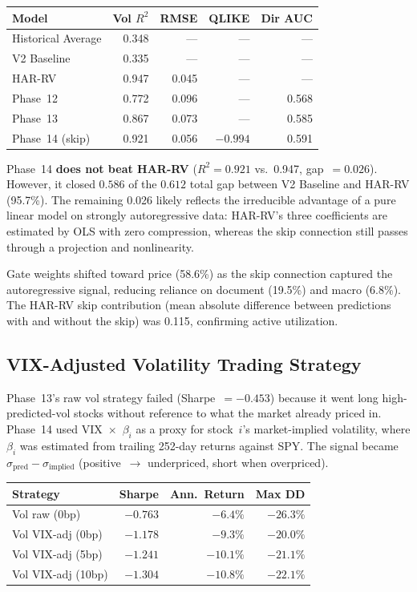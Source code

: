 \documentclass[12pt,a4paper]{article}
\begin{document}
\begin{center}
\begin{tabular}{l r r r r}
\hline
\textbf{Model} & \textbf{Vol $R^2$} & \textbf{RMSE} & \textbf{QLIKE} & \textbf{Dir AUC} \\
\hline
Historical Average & 0.348 & --- & --- & --- \\
V2 Baseline        & 0.335 & --- & --- & --- \\
HAR-RV             & 0.947 & 0.045 & --- & --- \\
Phase~12           & 0.772 & 0.096 & --- & 0.568 \\
Phase~13           & 0.867 & 0.073 & --- & 0.585 \\
Phase~14 (skip)    & 0.921 & 0.056 & $-0.994$ & 0.591 \\
\hline
\end{tabular}
\end{center}

Phase~14 \textbf{does not beat HAR-RV} ($R^2 = 0.921$ vs.\ 0.947, gap~$= 0.026$).
However, it closed $0.586$ of the $0.612$ total gap between V2 Baseline and
HAR-RV (95.7\%).  The remaining 0.026 likely reflects the irreducible advantage
of a pure linear model on strongly autoregressive data: HAR-RV's three
coefficients are estimated by OLS with zero compression, whereas the skip
connection still passes through a projection and nonlinearity.

Gate weights shifted toward price (58.6\%) as the skip connection captured the
autoregressive signal, reducing reliance on document (19.5\%) and macro (6.8\%).
The HAR-RV skip contribution (mean absolute difference between predictions with
and without the skip) was 0.115, confirming active utilization.

\subsection{VIX-Adjusted Volatility Trading Strategy}

Phase~13's raw vol strategy failed (Sharpe~$= -0.453$) because it went long
high-predicted-vol stocks without reference to what the market already priced in.
Phase~14 used VIX~$\times$~$\beta_i$ as a proxy for stock~$i$'s market-implied
volatility, where $\beta_i$ was estimated from trailing 252-day returns against
SPY.  The signal became $\sigma_{\text{pred}} - \sigma_{\text{implied}}$
(positive~$\to$ underpriced, short when overpriced).

\begin{center}
\begin{tabular}{l r r r}
\hline
\textbf{Strategy} & \textbf{Sharpe} & \textbf{Ann.\ Return} & \textbf{Max DD} \\
\hline
Vol raw (0bp)       & $-0.763$ & $-6.4\%$ & $-26.3\%$ \\
Vol VIX-adj (0bp)   & $-1.178$ & $-9.3\%$ & $-20.0\%$ \\
Vol VIX-adj (5bp)   & $-1.241$ & $-10.1\%$ & $-21.1\%$ \\
Vol VIX-adj (10bp)  & $-1.304$ & $-10.8\%$ & $-22.1\%$ \\
\hline
\end{tabular}
\end{center}
\end{document}
